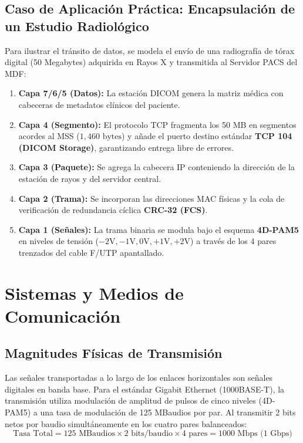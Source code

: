 \documentclass[11pt,a4paper]{article}
\begin{document}
\subsection{Caso de Aplicación Práctica: Encapsulación de un Estudio Radiológico}
Para ilustrar el tránsito de datos, se modela el envío de una radiografía de tórax digital (50 Megabytes) adquirida en Rayos X y transmitida al Servidor PACS del MDF:
\begin{enumerate}[noitemsep]
    \item \textbf{Capa 7/6/5 (Datos):} La estación DICOM genera la matriz médica con cabeceras de metadatos clínicos del paciente.
    \item \textbf{Capa 4 (Segmento):} El protocolo TCP fragmenta los 50 MB en segmentos acordes al MSS ($1,460\text{ bytes}$) y añade el puerto destino estándar \textbf{TCP 104 (DICOM Storage)}, garantizando entrega libre de errores.
    \item \textbf{Capa 3 (Paquete):} Se agrega la cabecera IP conteniendo la dirección de la estación de rayos y del servidor central.
    \item \textbf{Capa 2 (Trama):} Se incorporan las direcciones MAC físicas y la cola de verificación de redundancia cíclica \textbf{CRC-32 (FCS)}.
    \item \textbf{Capa 1 (Señales):} La trama binaria se modula bajo el esquema \textbf{4D-PAM5} en niveles de tensión ($-2\text{V}, -1\text{V}, 0\text{V}, +1\text{V}, +2\text{V}$) a través de los 4 pares trenzados del cable F/UTP apantallado.
\end{enumerate}

\section{Sistemas y Medios de Comunicación}

\subsection{Magnitudes Físicas de Transmisión}
Las señales transportadas a lo largo de los enlaces horizontales son señales digitales en banda base. Para el estándar Gigabit Ethernet (1000BASE-T), la transmisión utiliza modulación de amplitud de pulsos de cinco niveles (4D-PAM5) a una tasa de modulación de 125 MBaudios por par. Al transmitir 2 bits netos por baudio simultáneamente en los cuatro pares balanceados:
\begin{equation}
    \text{Tasa Total} = 125\text{ MBaudios} \times 2\text{ bits/baudio} \times 4\text{ pares} = 1000\text{ Mbps (1 Gbps)}
\end{equation}
\end{document}
